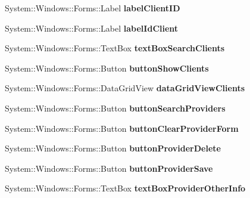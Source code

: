 \begin{DoxyCompactItemize}
System\+::\+Windows\+::\+Forms\+::\+Label {\bfseries label\+Client\+ID}
\item 
\hypertarget{class_magazyn_1_1_magazin_a99ef2d9f03d0b7391f2e21b14cea3d41}{}\label{class_magazyn_1_1_magazin_a99ef2d9f03d0b7391f2e21b14cea3d41} 
System\+::\+Windows\+::\+Forms\+::\+Label {\bfseries label\+Id\+Client}
\item 
\hypertarget{class_magazyn_1_1_magazin_ae881411789ff1daa68a84a3f672f0a88}{}\label{class_magazyn_1_1_magazin_ae881411789ff1daa68a84a3f672f0a88} 
System\+::\+Windows\+::\+Forms\+::\+Text\+Box {\bfseries text\+Box\+Search\+Clients}
\item 
\hypertarget{class_magazyn_1_1_magazin_a67bbf9a30d2964a1c524139a5a038af0}{}\label{class_magazyn_1_1_magazin_a67bbf9a30d2964a1c524139a5a038af0} 
System\+::\+Windows\+::\+Forms\+::\+Button {\bfseries button\+Show\+Clients}
\item 
\hypertarget{class_magazyn_1_1_magazin_a849c267eb6b6274024a75b6de2be617e}{}\label{class_magazyn_1_1_magazin_a849c267eb6b6274024a75b6de2be617e} 
System\+::\+Windows\+::\+Forms\+::\+Data\+Grid\+View {\bfseries data\+Grid\+View\+Clients}
\item 
\hypertarget{class_magazyn_1_1_magazin_aae02de905bfb62b830fecd402df4c671}{}\label{class_magazyn_1_1_magazin_aae02de905bfb62b830fecd402df4c671} 
System\+::\+Windows\+::\+Forms\+::\+Button {\bfseries button\+Search\+Providers}
\item 
\hypertarget{class_magazyn_1_1_magazin_ab35549abfc7603c9d83a4a59e9ec3194}{}\label{class_magazyn_1_1_magazin_ab35549abfc7603c9d83a4a59e9ec3194} 
System\+::\+Windows\+::\+Forms\+::\+Button {\bfseries button\+Clear\+Provider\+Form}
\item 
\hypertarget{class_magazyn_1_1_magazin_af3f3a1e798070b8aa2aa819181d4486d}{}\label{class_magazyn_1_1_magazin_af3f3a1e798070b8aa2aa819181d4486d} 
System\+::\+Windows\+::\+Forms\+::\+Button {\bfseries button\+Provider\+Delete}
\item 
\hypertarget{class_magazyn_1_1_magazin_ad770b46c617666da8be62c1f32e06cbd}{}\label{class_magazyn_1_1_magazin_ad770b46c617666da8be62c1f32e06cbd} 
System\+::\+Windows\+::\+Forms\+::\+Button {\bfseries button\+Provider\+Save}
\item 
\hypertarget{class_magazyn_1_1_magazin_ab8d93870a04e2055e8b8f1bacd97c0b7}{}\label{class_magazyn_1_1_magazin_ab8d93870a04e2055e8b8f1bacd97c0b7} 
System\+::\+Windows\+::\+Forms\+::\+Text\+Box {\bfseries text\+Box\+Provider\+Other\+Info}
\item 
\hypertarget{class_magazyn_1_1_magazin_a2a59fe9b34a5471bd3f181eac8622bc6}{}\label{class_magazyn_1_1_magazin_a2a59fe9b34a5471bd3f181eac8622bc6} 

\end{DoxyCompactItemize}
